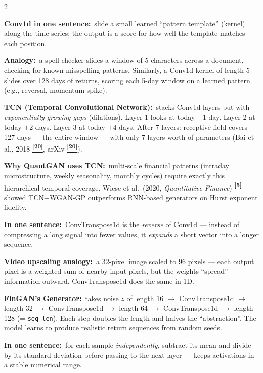 \documentclass[10pt]{article}
\newcommand{\skybox}[2]{\begin{tcolorbox}[mybox={Sky}{BBg},title={#1}]#2\end{tcolorbox}}
\newcommand{\amberbox}[2]{\begin{tcolorbox}[mybox={Amber}{ABg},title={#1}]#2\end{tcolorbox}}
\newcommand{\indigobox}[2]{\begin{tcolorbox}[mybox={Indigo}{IBg},title={#1}]#2\end{tcolorbox}}
\newcommand{\tcite}[1]{%
  \hyperlink{R:#1}{\textsuperscript{\scriptsize\textbf{[#1]}}}}
\begin{document}
\begin{multicols}{2}
\skybox{Conv1d + TCN: Pattern Detection at Multiple Scales (QuantGAN)}{%
\textbf{Conv1d in one sentence:}\ slide a small learned ``pattern template'' (kernel) along the time series; the output is a score for how well the template matches each position.

\smallskip
\textbf{Analogy:}\ a spell-checker slides a window of 5 characters across a document, checking for known misspelling patterns. Similarly, a Conv1d kernel of length 5 slides over 128 days of returns, scoring each 5-day window on a learned pattern (e.g., reversal, momentum spike).

\smallskip
\textbf{TCN (Temporal Convolutional Network):}\ stacks Conv1d layers but with \emph{exponentially growing gaps} (dilations). Layer 1 looks at today $\pm$1 day. Layer 2 at today $\pm$2 days. Layer 3 at today $\pm$4 days. After 7 layers: receptive field covers 127 days --- the entire window --- with only 7 layers worth of parameters (Bai et al., 2018\tcite{20}, arXiv\tcite{20}).

\smallskip
\textbf{Why QuantGAN uses TCN:}\ multi-scale financial patterns (intraday microstructure, weekly seasonality, monthly cycles) require exactly this hierarchical temporal coverage. Wiese et al.\ (2020, \textit{Quantitative Finance})\tcite{5} showed TCN+WGAN-GP outperforms RNN-based generators on Hurst exponent fidelity.}

\amberbox{ConvTranspose1d: The Expanding Generator (FinGAN)}{%
\textbf{In one sentence:}\ ConvTranspose1d is the \emph{reverse} of Conv1d --- instead of compressing a long signal into fewer values, it \emph{expands} a short vector into a longer sequence.

\smallskip
\textbf{Video upscaling analogy:}\ a 32-pixel image scaled to 96 pixels --- each output pixel is a weighted sum of nearby input pixels, but the weights ``spread'' information outward. ConvTranspose1d does the same in 1D.

\smallskip
\textbf{FinGAN's Generator:}\ takes noise $z$ of length 16 $\to$ ConvTranspose1d $\to$ length 32 $\to$ ConvTranspose1d $\to$ length 64 $\to$ ConvTranspose1d $\to$ length 128 (= \texttt{seq\_len}). Each step doubles the length and halves the ``abstraction''. The model learns to produce realistic return sequences from random seeds.}

\indigobox{LayerNorm: Keeping Values Calibrated}{%
\textbf{In one sentence:}\ for each sample \emph{independently}, subtract its mean and divide by its standard deviation before passing to the next layer --- keeps activations in a stable numerical range.

}
\end{multicols}
\end{document}
